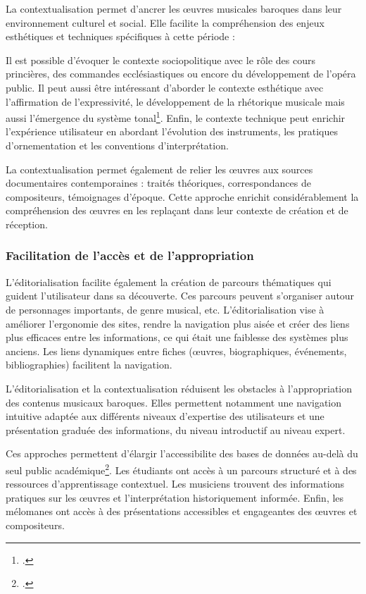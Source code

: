La contextualisation permet d'ancrer les œuvres musicales baroques dans leur environnement culturel et social. Elle facilite la compréhension des enjeux esthétiques et techniques spécifiques à cette période :

Il est possible d'évoquer le contexte sociopolitique avec le rôle des cours princières, des commandes ecclésiastiques ou encore du développement de l'opéra public. Il peut aussi être intéressant d'aborder le contexte esthétique avec l'affirmation de l'expressivité, le développement de la rhétorique musicale mais aussi l'émergence du système tonal\footcite{francois-sappeyChapitreIIAge2023}. Enfin, le contexte technique peut enrichir l'expérience utilisateur en abordant l'évolution des instruments, les pratiques d'ornementation et les conventions d'interprétation.

La contextualisation permet également de relier les œuvres aux sources documentaires contemporaines : traités théoriques, correspondances de compositeurs, témoignages d'époque. Cette approche enrichit considérablement la compréhension des œuvres en les replaçant dans leur contexte de création et de réception.

\subsubsection{Facilitation de l'accès et de l'appropriation}

L'éditorialisation facilite également la création de parcours thématiques qui guident l'utilisateur dans sa découverte. Ces parcours peuvent s'organiser autour de personnages importants, de genre musical, etc. L'éditorialisation vise à améliorer l'ergonomie des sites, rendre la navigation plus aisée et créer des liens plus efficaces entre les informations, ce qui était une faiblesse des systèmes plus anciens. Les liens dynamiques entre fiches (œuvres, biographiques, événements, bibliographies) facilitent la navigation.

L'éditorialisation et la contextualisation réduisent les obstacles à l'appropriation des contenus musicaux baroques. Elles permettent notamment une navigation intuitive adaptée aux différents niveaux d'expertise des utilisateurs et une présentation graduée des informations, du niveau introductif au niveau expert.

Ces approches permettent d'élargir l'\gls{accessibilite} des bases de données au-delà du seul public académique\footcite{FaciliterReperageAcces2014}. Les étudiants ont accès à un parcours structuré et à des ressources d'apprentissage contextuel. Les musiciens trouvent des informations pratiques sur les œuvres et l'interprétation historiquement informée. Enfin, les mélomanes ont accès à des présentations accessibles et engageantes des œuvres et compositeurs.

